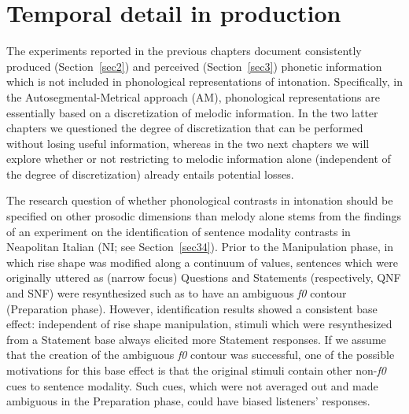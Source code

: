\chapter[Temporal detail in production]{Temporal detail in production}\label{sec4}
The experiments reported in the previous chapters document consistently produced (Section~\ref{sec2}) and perceived (Section~\ref{sec3}) phonetic information which is not included in phonological representations of intonation. Specifically, in the Autoseg\-mental-Metrical approach (AM), phonological representations are essentially based on a discretization of melodic information. In the two latter chapters we questioned the degree of discretization that can be performed without losing useful information, whereas in the two next chapters we will explore whether or not restricting to melodic information alone (independent of the degree of discretization) already entails potential losses. 

The research question of whether phonological contrasts in intonation should be specified on other prosodic dimensions than melody alone stems from the findings of an experiment on the identification of sentence modality contrasts in Neapolitan Italian (NI; see Section~\ref{sec34}). Prior to the Manipulation phase, in which rise shape was modified along a continuum of values, sentences which were originally uttered as (narrow focus) Questions and Statements (respectively, QNF and SNF) were resynthesized such as to have an ambiguous \textit{f0} contour (Preparation phase). However, identification results showed a consistent base effect: independent of rise shape manipulation, stimuli which were resynthesized from a Statement base always elicited more Statement responses. If we assume that the creation of the ambiguous \textit{f0} contour was successful, one of the possible motivations for this base effect is that the original stimuli contain other non-\textit{f0} cues to sentence modality. Such cues, which were not averaged out and made ambiguous in the Preparation phase, could have biased listeners' responses.

